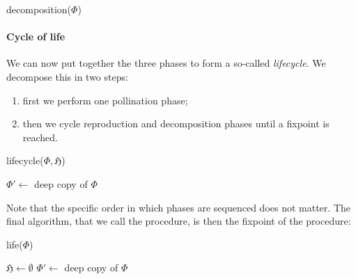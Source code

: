 \begin{procedure}[H]
  \caption{decomposition($\Phi$)}
  \BlankLine

\end{procedure}

\paragraph{Cycle of life}

We can now put together the three phases to form a so-called \emph{lifecycle}.
We decompose this in two steps:
\begin{enumerate}
  \item first we perform one pollination phase;
  \item then we cycle reproduction and decomposition phases until a fixpoint is
  reached.
\end{enumerate}

\begin{procedure}[H]
  \caption{lifecycle($\Phi, \mathfrak{H}$)}
  \BlankLine

  \;
  \BlankLine
  
  $\Phi' \longleftarrow $ deep copy of $\Phi$\;
  \;
  \;
\end{procedure}

Note that the specific order in which phases are sequenced does not matter. The
final algorithm, that we call the  procedure, is then the fixpoint
of the  procedure:

\begin{procedure}[H]
  \caption{life($\Phi$)}
  \BlankLine

  $\mathfrak{H} \longleftarrow \emptyset$\;
  $\Phi' \longleftarrow $ deep copy of $\Phi$\;
  \;
\end{procedure}


